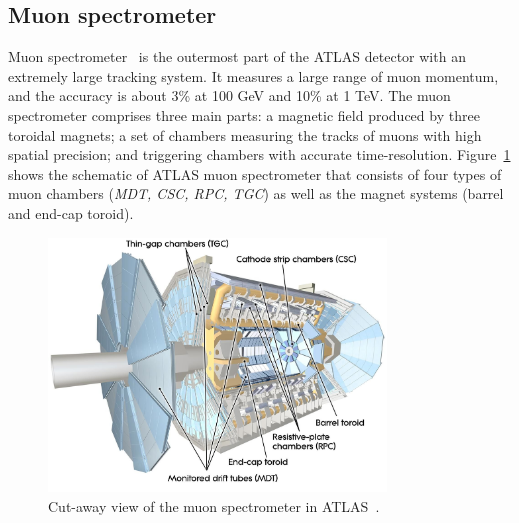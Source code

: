 \subsection{Muon spectrometer}

Muon spectrometer~\cite{CERN-LHCC-97-022} is the outermost part of the ATLAS detector with an extremely large tracking system.
It measures a large range of muon momentum, and the accuracy is about 3\% at 100 GeV and 10\% at 1 TeV.
The muon spectrometer comprises three main parts: a magnetic field produced by three toroidal magnets;
a set of chambers measuring the tracks of muons with high spatial precision; and triggering chambers with accurate time-resolution. 
Figure~\ref{fig:muon_dec} shows the schematic of ATLAS muon spectrometer that consists of four types of muon chambers 
(\textit{MDT, CSC, RPC, TGC}) as well as the magnet systems (barrel and end-cap toroid).
\begin{figure}[!htb]
  \centering
  \includegraphics[width=0.8\textwidth]{figures/Detector/muon_all.png}
  \caption{Cut-away view of the muon spectrometer in ATLAS~\cite{Sliwa:2013oua}.}
  \label{fig:muon_dec}
\end{figure}

